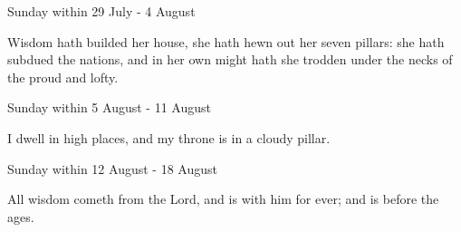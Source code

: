 \begin{multicols}{2}
\begin{inhead}
Sunday within 29 July - 4 August
\end{inhead}\par\noindent
Wisdom hath builded her house, {\dag} she hath hewn out her seven pillars: she hath subdued the nations, and in her own might hath she trodden under the necks of the proud and lofty.
\begin{inhead}
Sunday within 5 August - 11 August
\end{inhead}\par\noindent
I dwell {\dag} in high places, and my throne is in a cloudy pillar.
\begin{inhead}
Sunday within 12 August - 18 August
\end{inhead}\par\noindent
All wisdom {\dag} cometh from the Lord, and is with him for ever; and is before the ages.


\end{multicols}
